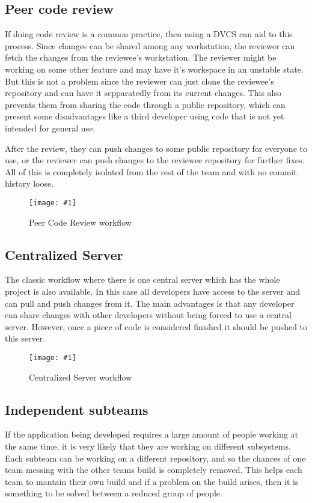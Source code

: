\documentclass[a4paper,10pt]{article}
\newcommand{\diagrama}[2]{
    \begin{figure}[h]
        \begin{center}
            \texttt{[image: \#1]} 
        \end{center}
        \caption{#2}
    \end{figure}
}
\begin{document}
\subsection{Peer code review}
If doing code review is a common practice, then using a DVCS can aid to this process. Since changes can be shared
among any workstation, the reviewer can fetch the changes from the reviewee's workstation. The reviewer might be
working on some other feature and may have it's workspace in an unstable state. But this is not a problem since the
reviewer can just clone the reviewee's repository and can have it sepparatedly from its current changes.
This also prevents them from sharing the code through a public repository, which can present some disadvantages like
a third developer using code that is not yet intended for general use.

After the review, they can push changes to some public repository for everyone to use, or the reviewer can push changes to the reviewee repository for further fixes. All of this is completely isolated from the rest of the team and with no commit history loose.

\diagrama{PeerCodeReview.jpg}{Peer Code Review workflow}

\subsection{Centralized Server}
The classic workflow where there is one central server which has the whole project is also available. In this case all developers have access to the server and can pull and push changes from it. The main advantages is that any developer can share changes with other developers without being forced to use a central server. However, once a piece of code is considered finished it should be pushed to this server.

\diagrama{RepoCentral.jpg}{Centralized Server workflow}


\subsection{Independent subteams}
If the application being developed requires a large amount of people working at the same time, it is very likely that they are working on different subsystems. Each subteam can be working on a different repository, and so the chances of one team messing with the other teams build is completely removed. This helps each team to mantain their own build and if a problem on the build arises, then it is something to be solved between a reduced group of people.
\end{document}
